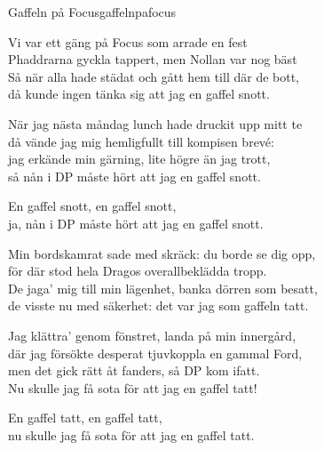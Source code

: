 \begin{song}{Gaffeln på Focus}{gaffelnpafocus}

\begin{vers}
Vi var ett gäng på Focus som arrade en fest \\
Phaddrarna gyckla tappert, men Nollan var nog bäst \\
Så när alla hade städat och gått hem till där de bott, \\
då kunde ingen tänka sig att jag en gaffel snott.\\
\end{vers}

\begin{vers}
När jag nästa måndag lunch hade druckit upp mitt te\\
då vände jag mig hemligfullt till kompisen brevé:\\
jag erkände min gärning, lite högre än jag trott,\\
så nån i DP måste hört att jag en gaffel snott.\\
\end{vers}

\begin{vers}
En gaffel snott, en gaffel snott,\\
ja, nån i DP måste hört att jag en gaffel snott.\\
\end{vers}

\begin{vers}
Min bordskamrat sade med skräck: du borde se dig opp,\\
för där stod hela Dragos overallbeklädda tropp.\\
De jaga' mig till min lägenhet, banka dörren som besatt,\\
de visste nu med säkerhet: det var jag som gaffeln tatt.\\
\end{vers}

\begin{vers}
Jag klättra' genom fönstret, landa på min innergård,\\
där jag försökte desperat tjuvkoppla en gammal Ford,\\
men det gick rätt åt fanders, så DP kom ifatt.\\
Nu skulle jag få sota för att jag en gaffel tatt!\\
\end{vers}

\begin{vers}
En gaffel tatt, en gaffel tatt,\\
nu skulle jag få sota för att jag en gaffel tatt.\\
\end{vers}


\end{song}
